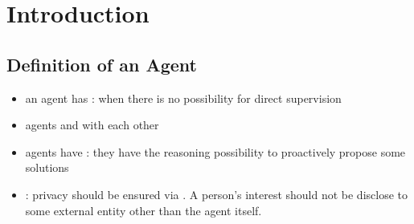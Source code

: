 \chapter{Introduction}
\minitoc

\section{Definition of an Agent}
\begin{itemize}
\item an agent has : when there is no possibility for direct supervision
\item agents  and  with each other
\item agents have : they have the reasoning possibility to proactively propose some solutions
\item {}: privacy should be ensured via . A person's interest should not be disclose to some external entity other than the agent itself.
\end{itemize}

